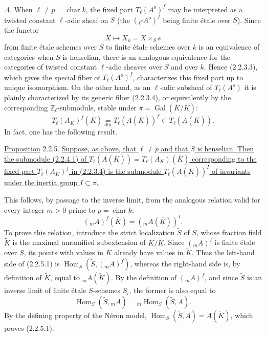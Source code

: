\medskip
{}.4. When $\ell\ne p=\operatorname{char}k$, the fixed part
$T_\ell(A^o)^f$ may be interpreted as a twisted constant $\ell$-adic
sheaf on $S$ (the $({}_{\ell^\nu}A^o)^f$ being finite \'{e}tale over
$S$).  Since the functor
\[
 X\longmapsto X_o=X\times_Ss
\]
from finite \'{e}tale schemes over $S$ to finite \'{e}tale schemes
over $k$ is an equivalence of categories when $S$ is henselian, there
is an analogous equivalence for the categories of twisted constant
$\ell$-adic sheaves over $S$ and over $k$.  Hence (2.2.3.3), which
gives the special fiber of $T_\ell(A^o)^f$, characterizes this fixed
part up to unique isomorphism.  On the other hand, as an $\ell$-adic
subsheaf of $T_\ell(A^o)$ it is plainly characterized by its generic
fiber (2.2.3.4), or equivalently by the corresponding
$\mathbb Z_\ell$-submodule, stable under
$\pi=\operatorname{Gal}(\overline K/K)$:
\begin{equation}\tag{2.2.4.1}
 T_\ell(A_K)^f(\overline K)
 \underset{\mathrm{dfn}}{=}T_\ell(A(\overline K))^f
 \subset T_\ell(A(\overline K)).
\end{equation}
In fact, one has the following result.

\medskip
\noindent
\underline{Proposition} 2.2.5. \underline{Suppose, as above, that
$\ell\ne p$ and that $S$ is henselian.  Then the submodule (2.2.4.1)
of $T_\ell(A(\overline K))=T_\ell(A_K)(\overline K)$ corresponding to
the fixed part $T_\ell(A_K)^f$ in (2.2.3.4) is the submodule
$T_\ell(A(\overline K))^I$ of invariants under the inertia group
$I\subset\pi$.}

This follows, by passage to the inverse limit, from the analogous
relation valid for every integer $m>0$ prime to
$p=\operatorname{char}k$:
\begin{equation}\tag{2.2.5.1}
 ({}_mA)^f(\overline K)=({}_mA(\overline K))^I.
\end{equation}
To prove this relation, introduce the strict localization $\widetilde S$
of $S$, whose fraction field $\widetilde K$ is the maximal unramified
subextension of $\overline K/K$.  Since $({}_mA)^f$ is finite
\'{e}tale over $S$, its points with values in $\overline K$ already
have values in $\widetilde K$.  Thus the left-hand side of (2.2.5.1)
is
$\operatorname{Hom}_S(\widetilde S,({}_mA)^f)$, whereas the right-hand
side is, by definition of $\widetilde K$, equal to ${}_mA(\widetilde K)$.
By the definition of $({}_mA)^f$, and since $\widetilde S$ is an
inverse limit of finite \'{e}tale $S$-schemes $S_i$, the former is also
equal to
\[
 \operatorname{Hom}_S(\widetilde S,{}_mA)
 ={}_m\operatorname{Hom}_S(\widetilde S,A).
\]
By the defining property of the N\'{e}ron model,
$\operatorname{Hom}_S(\widetilde S,A)=A(\widetilde K)$, which proves
(2.2.5.1).

